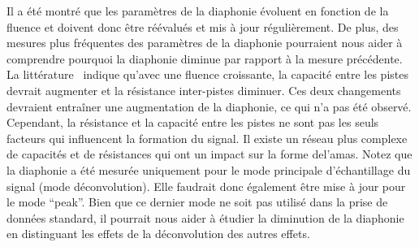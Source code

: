 
Il a été montré que les paramètres de la diaphonie évoluent en fonction de la fluence et doivent donc être réévalués et mis à jour régulièrement. De plus, des mesures plus fréquentes des paramètres de la diaphonie pourraient nous aider à comprendre pourquoi la diaphonie diminue par rapport à la mesure précédente. La littérature~\cite{Hartmann:2017gzy} indique qu'avec une fluence croissante, la capacité entre les pistes devrait augmenter et la résistance inter-pistes diminuer. Ces deux changements devraient entraîner une augmentation de la diaphonie, ce qui n’a pas été observé. Cependant, la résistance et la capacité entre les pistes ne sont pas les seuls facteurs qui influencent la formation du signal. Il existe un réseau plus complexe de capacités et de résistances qui ont un impact sur la forme del'amas. Notez que la diaphonie a été mesurée uniquement pour le mode principale d'échantillage du signal (mode déconvolution). Elle faudrait donc également être mise à jour pour le mode ``peak''. Bien que ce dernier mode ne soit pas utilisé dans la prise de données standard, il pourrait nous aider à étudier la diminution de la diaphonie en distinguant les effets de la déconvolution des autres effets.

